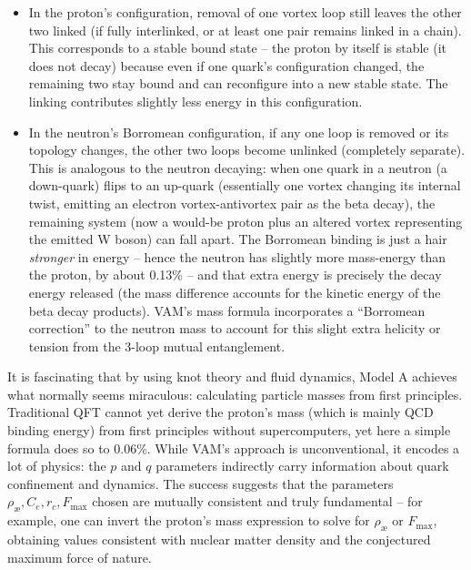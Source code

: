 \documentclass[a4paper,12pt]{article}
\begin{document}
        \begin{itemize}
            \item In the proton's configuration, removal of one vortex loop still leaves the other two linked (if fully interlinked, or at least one pair remains linked in a chain). This corresponds to a stable bound state -- the proton by itself is stable (it does not decay) because even if one quark's configuration changed, the remaining two stay bound and can reconfigure into a new stable state. The linking contributes slightly less energy in this configuration.
        
            \item In the neutron's Borromean configuration, if any one loop is removed or its topology changes, the other two loops become unlinked (completely separate). This is analogous to the neutron decaying: when one quark in a neutron (a down-quark) flips to an up-quark (essentially one vortex changing its internal twist, emitting an electron vortex-antivortex pair as the beta decay), the remaining system (now a would-be proton plus an altered vortex representing the emitted W boson) can fall apart. The Borromean binding is just a hair \textit{stronger} in energy -- hence the neutron has slightly more mass-energy than the proton, by about 0.13\% -- and that extra energy is precisely the decay energy released (the mass difference accounts for the kinetic energy of the beta decay products). VAM's mass formula incorporates a ``Borromean correction'' to the neutron mass to account for this slight extra helicity or tension from the 3-loop mutual entanglement.
        \end{itemize}
        
        It is fascinating that by using knot theory and fluid dynamics, Model A achieves what normally seems miraculous: calculating particle masses from first principles. Traditional QFT cannot yet derive the proton's mass (which is mainly QCD binding energy) from first principles without supercomputers, yet here a simple formula does so to 0.06\%. While VAM's approach is unconventional, it encodes a lot of physics: the $p$ and $q$ parameters indirectly carry information about quark confinement and dynamics. The success suggests that the parameters $\rho_{\text{\ae}}, C_e, r_c, F_{\max}$ chosen are mutually consistent and truly fundamental -- for example, one can invert the proton's mass expression to solve for $\rho_{\text{\ae}}$ or $F_{\max}$, obtaining values consistent with nuclear matter density and the conjectured maximum force of nature.
        
\end{document}
